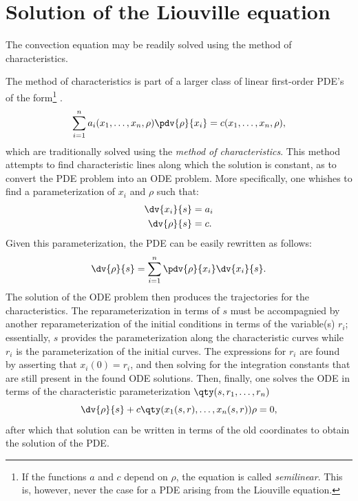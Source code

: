 \section{Solution of the Liouville equation}
\label{ssec:ho_liouville_solution}
The convection equation may be readily solved using the method of characteristics.
\begin{aside}{The method of characteristics}
     is part of a larger class of linear first-order PDE's of the form\footnote{If the functions $a$ and $c$ depend on $\rho$, the equation is called \emph{semilinear}. This is, however, never the case for a PDE arising from the Liouville equation.} \cite[p. 207]{Farlow1989}. \begin{equation} \sum_{i=1}^n a_i(x_1, \ldots, x_n, \rho) \pdv{\rho}{x_i} = c(x_1, \ldots, x_n, \rho), \label{eq:fo_pde}\end{equation}
    which are traditionally solved using the \emph{method of characteristics}. This method attempts to find characteristic lines along which the solution is constant, as to convert the PDE problem into an ODE problem. More specifically, one whishes to find a parameterization of $x_i$ and $\rho$ such that:
    \begin{equation}
        \begin{split}
            \dv{x_i}{s} &= a_i\\
            \dv{\rho}{s} &= c.
        \end{split}
    \end{equation}
    Given this parameterization, the PDE can be easily rewritten as follows: \cite{Farlow1989}
    $$ \dv{\rho}{s} = \sum_{i = 1}^n \pdv{\rho}{x_i}\dv{x_i}{s}. $$
    The solution of the ODE problem then produces the trajectories for the characteristics. The reparameterization in terms of $s$ must be accompagnied by another reparameterization of the initial conditions in terms of the variable(s) $r_i$; essentially, $s$ provides the parameterization along the characteristic curves while $r_i$ is the parameterization of the initial curves. The expressions for $r_i$ are found by asserting that $x_i(0) = r_i$, and then solving for the integration constants that are still present in the found ODE solutions. Then, finally, one solves the ODE in terms of the characteristic parameterization $\qty(s, r_1, \ldots, r_n)$
    $$ \dv{\rho}{s} + c\qty(x_1(s, r), \ldots, x_n(s, r))\rho = 0, $$
    after which that solution can be written in terms of the old coordinates to obtain the solution of the PDE.
    \tcblower

\end{aside}
